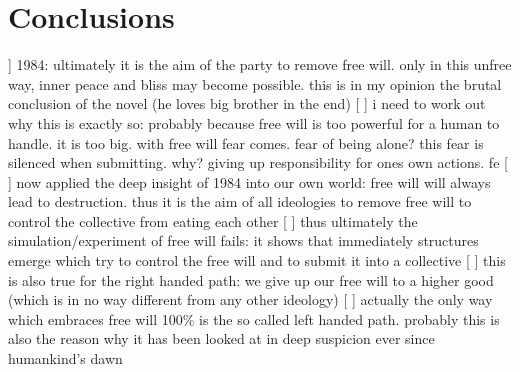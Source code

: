\section{Conclusions}

 ] 1984: ultimately it is the aim of the party to remove free will. only in this unfree way, inner peace and bliss may become possible. this is in my opinion the brutal conclusion of the novel (he loves big brother in the end)
[ ] i need to work out why this is exactly so: probably because free will is too powerful for a human to handle. it is too big. with free will fear comes. fear of being alone? this fear is silenced when submitting. why? giving up responsibility for ones own actions. fe
[ ] now applied the deep insight of 1984 into our own world: free will will always lead to destruction. thus it is the aim of all ideologies to remove free will to control the collective from eating each other
[ ] thus ultimately the simulation/experiment of free will fails: it shows that immediately structures emerge which try to control the free will and to submit it into a collective
[ ] this is also true for the right handed path: we give up our free will to a higher good (which is in no way different from any other ideology)
[ ] actually the only way which embraces free will 100\% is the so called left handed path. probably this is also the reason why it has been looked at in deep suspicion ever since humankind's dawn